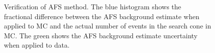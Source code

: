 \begin{figure}
 	\centering
	\caption{Verification of AFS method.  The blue histogram shows the fractional difference between the AFS background estimate when applied to MC and the actual number of events in the search cone in MC.  The green shows the AFS background estimate uncertainty when applied to data. }
	\label{fig:AFS_verification} 
\end{figure}  


